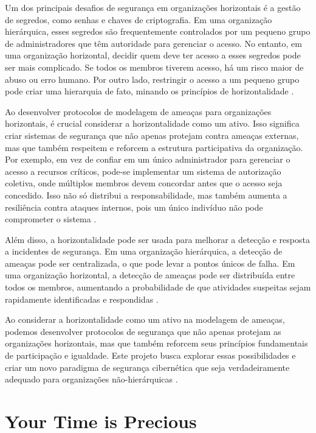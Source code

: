 Um dos principais desafios de segurança em organizações horizontais é a gestão
de segredos, como senhas e chaves de criptografia. Em uma organização
hierárquica, esses segredos são frequentemente controlados por um pequeno grupo de
administradores que têm autoridade para gerenciar o acesso. No entanto, em uma organização
horizontal, decidir quem deve ter acesso a esses segredos pode ser mais complicado. Se
todos os membros tiverem acesso, há um risco maior de abuso ou erro humano. Por
outro lado, restringir o acesso a um pequeno grupo pode criar uma hierarquia de
fato, minando os princípios de horizontalidade \cite{Colbac}. 

Ao desenvolver protocolos de modelagem de ameaças para organizações
horizontais, é crucial considerar a horizontalidade como um ativo. Isso significa criar
sistemas de segurança que não apenas protejam contra ameaças externas, mas que também
respeitem e reforcem a estrutura participativa da organização. Por exemplo, em vez de
confiar em um único administrador para gerenciar o acesso a recursos críticos, pode-se
implementar um sistema de autorização coletiva, onde múltiplos membros devem concordar
antes que o acesso seja concedido. Isso não só distribui a responsabilidade, mas
também aumenta a resiliência contra ataques internos, pois um único indivíduo não
pode comprometer o sistema \cite{Colbac}.

Além disso, a horizontalidade pode ser usada para
melhorar a detecção e resposta a incidentes de segurança. Em uma organização
hierárquica, a detecção de ameaças pode ser centralizada, o que pode levar a pontos únicos
de falha. Em uma organização horizontal, a detecção de ameaças pode ser
distribuída entre todos os membros, aumentando a probabilidade de que atividades suspeitas
sejam rapidamente identificadas e respondidas \cite{AbcCrypto}.

Ao considerar a horizontalidade como um ativo na modelagem de ameaças, podemos
desenvolver protocolos de segurança que não apenas protejam as organizações horizontais,
mas que também reforcem seus princípios fundamentais de participação e igualdade. Este
projeto busca explorar essas possibilidades e criar um novo paradigma de segurança
cibernética que seja verdadeiramente adequado para organizações não-hierárquicas \cite{MicrosoftBible}.

\section{Your Time is Precious}
\label{sub:time_is_money}


